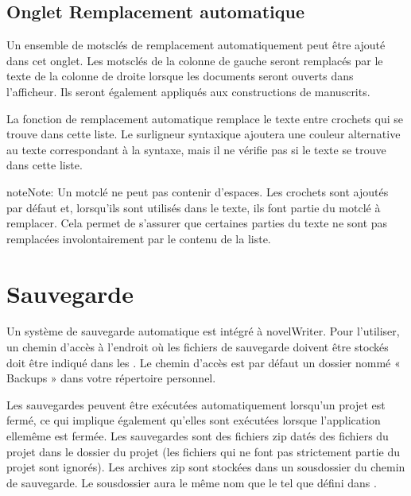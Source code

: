 \documentclass[a4paper,11pt,french]{sphinxmanual}
\begin{document}
\subsection{Onglet Remplacement automatique}
\label{\detokenize{project_overview:auto-replace-tab}}
\sphinxAtStartPar
Un ensemble de mots\sphinxhyphen{}clés de remplacement automatiquement peut être ajouté dans cet onglet. Les mots\sphinxhyphen{}clés de la colonne de gauche seront remplacés par le texte de la colonne de droite lorsque les documents seront ouverts dans l’afficheur. Ils seront également appliqués aux constructions de manuscrits.

\sphinxAtStartPar
La fonction de remplacement automatique remplace le texte entre crochets qui se trouve dans cette liste. Le surligneur syntaxique ajoutera une couleur alternative au texte correspondant à la syntaxe, mais il ne vérifie pas si le texte se trouve dans cette liste.

\begin{sphinxadmonition}{note}{Note:}
\sphinxAtStartPar
Un mot\sphinxhyphen{}clé ne peut pas contenir d’espaces. Les crochets sont ajoutés par défaut et, lorsqu’ils sont utilisés dans le texte, ils font partie du mot\sphinxhyphen{}clé à remplacer. Cela permet de s’assurer que certaines parties du texte ne sont pas remplacées involontairement par le contenu de la liste.
\end{sphinxadmonition}


\section{Sauvegarde}
\label{\detokenize{project_overview:backup}}\label{\detokenize{project_overview:a-proj-backup}}
\sphinxAtStartPar
Un système de sauvegarde automatique est intégré à novelWriter. Pour l’utiliser, un chemin d’accès à l’endroit où les fichiers de sauvegarde doivent être stockés doit être indiqué dans les . Le chemin d’accès est par défaut un dossier nommé « Backups » dans votre répertoire personnel.

\sphinxAtStartPar
Les sauvegardes peuvent être exécutées automatiquement lorsqu’un projet est fermé, ce qui implique également qu’elles sont exécutées lorsque l’application elle\sphinxhyphen{}même est fermée. Les sauvegardes sont des fichiers zip datés des fichiers du projet dans le dossier du projet (les fichiers qui ne font pas strictement partie du projet sont ignorés). Les archives zip sont stockées dans un sous\sphinxhyphen{}dossier du chemin de sauvegarde. Le sous\sphinxhyphen{}dossier aura le même nom que le  tel que défini dans {\hyperref[\detokenize{project_overview:a-proj-settings}]{}}.
\end{document}
